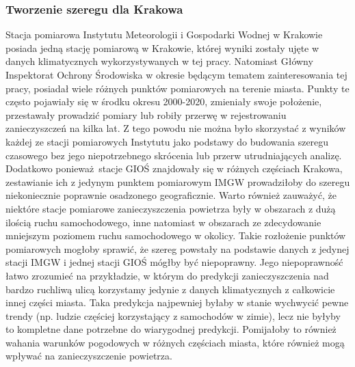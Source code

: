 \documentclass[10pt,a4paper]{article}
\begin{document}
\subsubsection{Tworzenie szeregu dla Krakowa}
Stacja pomiarowa Instytutu Meteorologii i Gospodarki Wodnej w Krakowie posiada jedną stację pomiarową w Krakowie, której wyniki zostały ujęte w danych klimatycznych wykorzystywanych w tej pracy. Natomiast Główny Inspektorat Ochrony Środowiska w okresie będącym tematem zainteresowania tej pracy, posiadał wiele różnych punktów pomiarowych na terenie miasta. Punkty te często pojawiały się w środku okresu 2000-2020, zmieniały swoje położenie, przestawały prowadzić pomiary lub robiły przerwę w rejestrowaniu zanieczyszczeń na kilka lat. Z tego powodu nie można było skorzystać z wyników każdej ze stacji pomiarowych Instytutu jako podstawy do budowania szeregu czasowego bez jego niepotrzebnego skrócenia lub przerw utrudniających analizę. Dodatkowo ponieważ stacje GIOŚ znajdowały się w różnych częściach Krakowa, zestawianie ich z jedynym punktem pomiarowym IMGW prowadziłoby do szeregu niekoniecznie poprawnie osadzonego geograficznie. Warto również zauważyć, że niektóre stacje pomiarowe zanieczyszczenia powietrza były w obszarach z dużą ilością ruchu samochodowego, inne natomiast w obszarach ze zdecydowanie mniejszym poziomem ruchu samochodowego w okolicy. Takie rozłożenie punktów pomiarowych mogłoby sprawić, że szereg powstały na podstawie danych z jedynej stacji IMGW i jednej stacji GIOŚ mógłby być niepoprawny. Jego niepoprawność łatwo zrozumieć na przykładzie, w którym do predykcji zanieczyszczenia nad bardzo ruchliwą ulicą korzystamy jedynie z danych klimatycznych z całkowicie innej części miasta. Taka predykcja najpewniej byłaby w stanie wychwycić pewne trendy (np. ludzie częściej korzystający z samochodów w zimie), lecz nie byłyby to kompletne dane potrzebne do wiarygodnej predykcji. Pomijałoby to również wahania warunków pogodowych w różnych częściach miasta, które również mogą wpływać na zanieczyszczenie powietrza.
\end{document}

